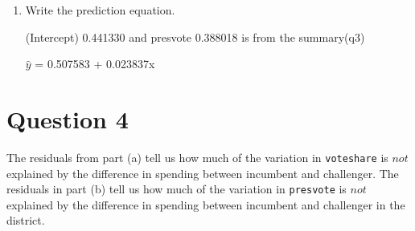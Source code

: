 \documentclass[12pt,letterpaper]{article}
\begin{document}
\begin{enumerate}
			\vspace{5cm}
		\item Write the prediction equation.
		
		
				(Intercept) 0.441330 and presvote 0.388018 is from the summary(q3)


$\hat{y}$	= 0.507583 + 0.023837x
		
		
	\end{enumerate}
	

\newpage	
\section*{Question 4}%
\noindent The residuals from part (a) tell us how much of the variation in \texttt{voteshare} is $not$ explained by the difference in spending between incumbent and challenger. The residuals in part (b) tell us how much of the variation in \texttt{presvote} is $not$ explained by the difference in spending between incumbent and challenger in the district.
\end{document}
